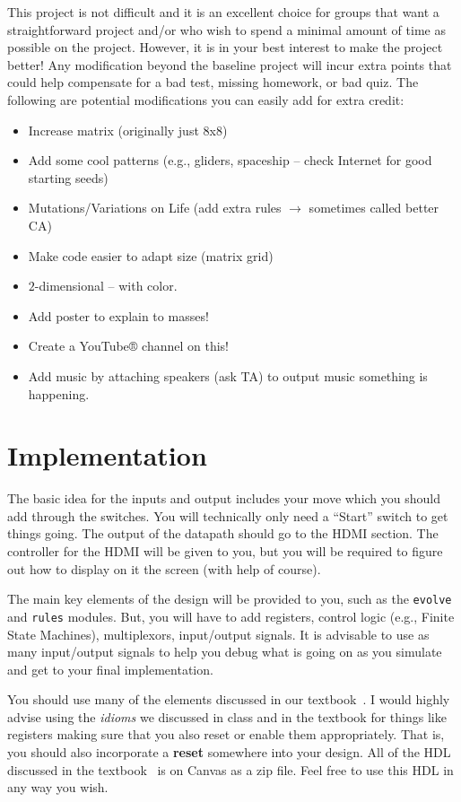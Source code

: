 \documentclass{article}
\begin{document}
This project is not difficult and it is an excellent choice for groups that want a straightforward
project and/or who wish to spend a minimal amount of time as possible on the project. However,
it is in your best interest to make the project better! Any modification beyond the baseline
project will incur extra points that could help compensate for a bad test, missing homework, or
bad quiz. The following are potential modifications you can easily add
for extra credit:
\begin{itemize}
\item Increase matrix (originally just 8x8)
\item Add some cool patterns (e.g., gliders, spaceship – check Internet for good starting seeds)
\item Mutations/Variations on Life (add extra rules $\rightarrow$ sometimes called better CA)
\item Make code easier to adapt size (matrix grid)
\item $2$-dimensional – with color.
\item Add poster to explain to masses!
\item Create a YouTube® channel on this!
\item Add music by attaching speakers (ask TA) to output music something is
  happening.
\end{itemize}

\section{Implementation}

The basic idea for the inputs and output includes your move which you
should add through the switches.  You will technically only need a
``Start'' switch to get things going.  The output of the datapath
should go to the HDMI section.  The controller for the HDMI will be
given to you, but you will be required to figure out how to display on
it the screen (with help of course).

The main key elements of the design will be provided to you, such as
the \verb!evolve! and \verb!rules!
modules.  But, you will have to add registers,
control logic (e.g., Finite State Machines), multiplexors, input/output signals.
It is advisable to use as many input/output signals to help you debug
what is going on as you simulate and get to your final
implementation.

You should use many of the elements discussed in our
textbook~\cite{ddca-riscv}.  I would highly advise using the
\textit{idioms} we discussed in class 
and in the textbook for things
like registers making sure that you also reset or enable them appropriately.
That is, you should also incorporate a \textbf{reset} somewhere into your
design.  All of the HDL discussed in the textbook~\cite{ddca-riscv} is
on Canvas as a zip file.  Feel free to use this HDL in any way you wish.
\end{document}
